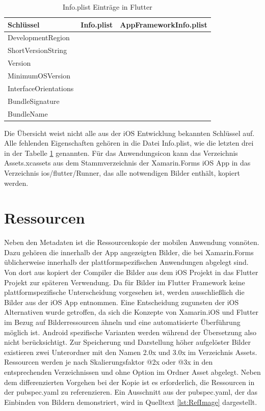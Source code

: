 \begin{table}[!ht]
  \begin{tabularx}{\linewidth}{|l|X|X|}
  \hline

  \textbf{Schlüssel}  &  \textbf{Info.plist} & \textbf{AppFrameworkInfo.plist} \\
\hline
  DevelopmentRegion  		&  					& 		\checkmark	 \\
  ShortVersionString  		&  					& 		\checkmark	 \\
  Version  							&  					& 		\checkmark	 \\
  MinimumOSVersion  		&  					& 		\checkmark	 \\
  
  InterfaceOrientations  		& \checkmark  	&		 					\\
  BundleSignature  			&  \checkmark 	& 							\\
  BundleName  					&  \checkmark 	& 		 					\\
  \hline
\end{tabularx}
\caption{Info.plist Einträge in Flutter}
 \label{tab:InfoPlist}
\end{table}
Die Übersicht weist nicht alle aus der iOS Entwicklung bekannten Schlüssel auf.  Alle fehlenden Eigenschaften gehören in die Datei \glq Info.plist\grq, wie die letzten drei in der Tabelle \ref{tab:InfoPlist} genannten. 
Für das Anwendungsicon kann das Verzeichnis \glq Assets.xcassets\grq{} aus dem Stammverzeichnis der Xamarin.Forms iOS App in das Verzeichnis \glq ios/flutter/Runner\grq , das alle notwendigen Bilder enthält,  kopiert werden. 

\section{Ressourcen}

Neben den Metadaten ist die Ressourcenkopie der mobilen Anwendung vonnöten.  Dazu gehören die innerhalb der App angezeigten Bilder, die bei Xamarin.Forms üblicherweise innerhalb der plattformspezifischen Anwendungen abgelegt sind. Von dort aus kopiert der Compiler die Bilder aus dem iOS Projekt in das Flutter Projekt zur späteren Verwendung.  Da für Bilder im Flutter Framework keine plattformspezifische Unterscheidung vorgesehen ist,  werden ausschließlich die Bilder aus der iOS App entnommen.  Eine Entscheidung zugunsten der iOS Alternativen wurde  getroffen,  da sich die Konzepte von Xamarin.iOS und Flutter im Bezug auf Bilderressourcen ähneln und eine automatisierte Überführung möglich ist.  Android spezifische Varianten werden während der Übersetzung also nicht berücksichtigt.   
Zur Speicherung und Darstellung höher aufgelöster Bilder existieren zwei Unterordner mit den Namen  \glq 2.0x\grq{} und  \glq 3.0x\grq{} im Verzeichnis Assets.  Ressourcen werden je nach Skalierungsfaktor  \glq @2x\grq{} oder  \glq @3x\grq{} in den entsprechenden Verzeichnissen und ohne Option im Ordner Asset abgelegt.
Neben dem differenzierten Vorgehen bei der Kopie ist es erforderlich,  die Ressourcen in der \glq pubspec.yaml\grq{} zu referenzieren.  Ein Ausschnitt aus der \glq pubspec.yaml\grq ,  der das Einbinden von Bildern demonstriert,  wird in Quelltext \ref{lst:RefImage} dargestellt.

